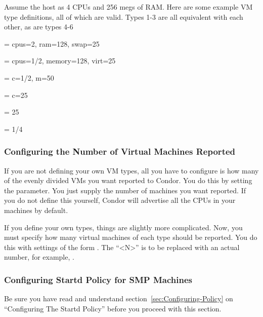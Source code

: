 Assume the host as 4 CPUs and 256 megs of RAM.
Here are some example VM type definitions, all of which are valid. 
Types 1-3 are all equivalent with each other, as are types 4-6

 = cpus=2, ram=128, swap=25%

 = cpus=1/2, memory=128, virt=25%

 = c=1/2, m=50%

 = c=25%

 = 25%

 = 1/4


\subsubsection{\label{sec:Config-VM-Number}
Configuring the Number of Virtual Machines Reported}

If you are not defining your own VM types, all you have to configure
is how many of the evenly divided VMs you want reported to Condor.
You do this by setting the  parameter.
You just supply the number of machines you want reported.
If you do not define this yourself, Condor will advertise all the CPUs
in your machines by default.

If you define your own types, things are slightly more complicated.  
Now, you must specify how many virtual machines of each type should be
reported.
You do this with settings of the form
.
The ``<N>'' is to be replaced with an actual number, for example, 
. 


\subsubsection{\label{sec:Config-SMP-Policy}
Configuring Startd Policy for SMP Machines}

\Note Be sure you have read and understand
section~\ref{sec:Configuring-Policy} on ``Configuring The Startd
Policy'' before you proceed with this section.

